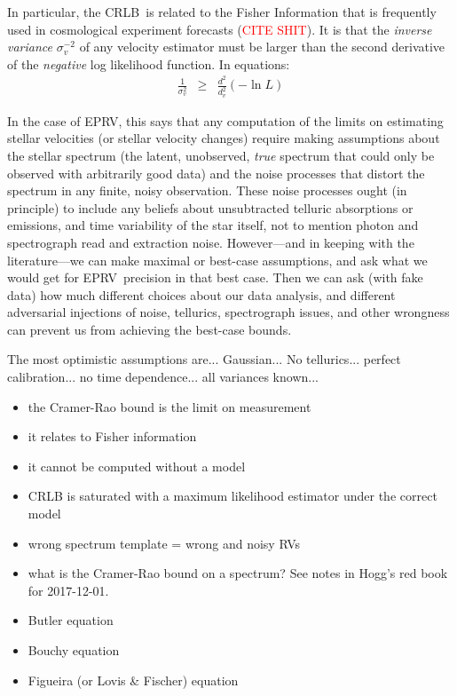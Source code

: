 \documentclass[modern]{aastex61}
\newcommand\todo[1]{\textcolor{red}{#1}}  %
\newcommand{\acronym}[1]{{\small{#1}}}
\newcommand{\RV}{\acronym{RV}}
\newcommand{\CRLB}{\acronym{CRLB}}
\newcommand{\EPRV}{\acronym{EPRV}}
\begin{document}
In particular, the \CRLB\ is related to the Fisher Information that is
frequently used in cosmological experiment forecasts (\todo{CITE
  SHIT}).
It is that the \emph{inverse variance} $\sigma_v^{-2}$ of any velocity
estimator must be larger than the second derivative of the
\emph{negative} log likelihood function.
In equations:
\begin{eqnarray}
\frac{1}{\sigma_v^2} &\geq& \frac{d^2}{d_v^2}(-\ln L)
\end{eqnarray}

In the case of \EPRV, this says that any computation of the limits
on estimating stellar velocities (or stellar velocity changes)
require making assumptions about the stellar spectrum (the
latent, unobserved, \emph{true} spectrum that could only be observed
with arbitrarily good data) and the noise processes that distort the
spectrum in any finite, noisy observation.
These noise processes ought (in principle) to include any beliefs about
unsubtracted telluric absorptions or emissions, and time variability
of the star itself, not to mention photon and spectrograph read and
extraction noise.
However---and in keeping with the literature---we can make maximal or
best-case assumptions, and ask what we would get for \EPRV\ precision
in that best case.
Then we can ask (with fake data) how much different choices about our
data analysis, and different adversarial injections of noise,
tellurics, spectrograph issues, and other wrongness can prevent us
from achieving the best-case bounds.

The most optimistic assumptions are... Gaussian... No
tellurics... perfect calibration... no time dependence... all
variances known...

\begin{itemize}
\item the Cramer-Rao bound is the limit on measurement
\item it relates to Fisher information
\item it cannot be computed without a model
\item CRLB is saturated with a maximum likelihood estimator under the correct model
\item wrong spectrum template = wrong and noisy \RV s
\end{itemize}

\begin{itemize}
\item what is the Cramer-Rao bound on a spectrum? See notes in Hogg's red book for 2017-12-01.
\item Butler equation
\item Bouchy equation
\item Figueira (or Lovis \& Fischer) equation
\end{itemize}
\end{document}
